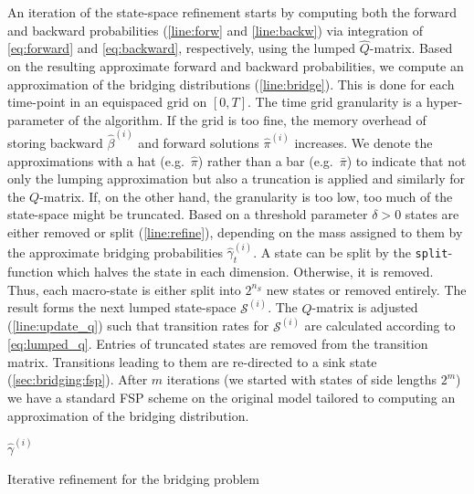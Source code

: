 An iteration of the state-space refinement starts by computing both the
forward and backward probabilities (\autoref{line:forw} and \autoref{line:backw})  via integration of \eqref{eq:forward} and
\eqref{eq:backward}, respectively, using
 the lumped $\hat Q$-matrix.
Based on the resulting approximate forward and backward probabilities, we
  compute an approximation of the
bridging distributions (\autoref{line:bridge}).
This is done for each time-point in an equispaced grid on $[0,T]$.
The time grid granularity is a hyper-parameter of the algorithm.
If the grid is too fine, the memory overhead of storing backward $\hat\beta^{(i)}$
and forward solutions $\hat\pi^{(i)}$ increases.
{We denote the approximations with a hat (e.g.\ $\hat{\pi}$) rather than a bar (e.g.\ $\bar{\pi}$) to indicate that not only the lumping approximation but also a truncation is applied and similarly for the $Q$-matrix.}
If, on the other hand, the granularity is too low, too much of
the state-space might be truncated.
Based on a threshold parameter $\delta>0$
states are either removed or split (\autoref{line:refine}), depending on
the mass assigned to them by the approximate bridging
probabilities $\hat\gamma^{(i)}_t$.
A state can be split by the \texttt{split}-function which
halves the state in each dimension.
Otherwise, it is removed.
Thus, each macro-state is either split into $2^{n_S}$ new states or removed
entirely.
The result forms the next lumped state-space $\mathcal{S}^{(i)}$.
 The   $Q$-matrix is adjusted (\autoref{line:update_q}) such that transition rates  for $\mathcal{S}^{(i)}$  are calculated according to 
 \eqref{eq:lumped_q}. 
 Entries of truncated states are removed from the transition matrix. Transitions leading to them are
re-directed to a sink state (\autoref{sec:bridging:fsp}).
After $m$ iterations (we started with states of side lengths $2^m$)
we have a standard \ac{FSP} scheme
on the original model tailored to
computing an approximation of the bridging distribution.
\begin{algorithm}[htb]
\Return ${\hat\gamma}^{(i)}$\;
    \caption{Iterative refinement for the bridging problem}
    \label{alg:refinement}
\end{algorithm}

